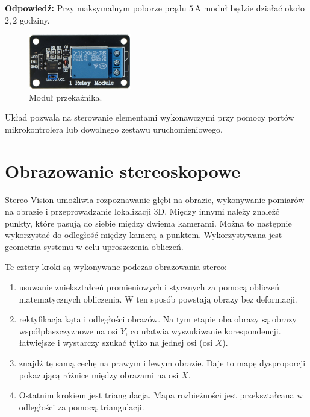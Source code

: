 \documentclass[magisterska]{pracadypl}
\begin{document}
\textbf{Odpowiedź:} Przy maksymalnym poborze prądu $5\,\mathrm{A}$ moduł będzie działać około $2{,}2$ godziny.

\begin{figure}[H]  %
    \centering  %
    \includegraphics[width=0.4\textwidth]{images/relay.png}  %
    \captionsetup{font=footnotesize}
    \caption[Moduł przekaźnika. https://botland.com.pl/przekazniki-przekazniki-arduino/1997-modul-przekaznika-1-kanal-z-optoizolacja-styki-10a-250vac-cewka-5v-5904422359096.html]{Moduł przekaźnika.}
\end{figure}

Układ pozwala na sterowanie elementami wykonawczymi przy pomocy portów mikrokontrolera lub dowolnego zestawu uruchomieniowego.

\section{Obrazowanie stereoskopowe}

Stereo Vision umożliwia rozpoznawanie głębi na obrazie, wykonywanie pomiarów na obrazie
i przeprowadzanie lokalizacji 3D. Między innymi należy znaleźć punkty, które pasują do siebie między dwiema kamerami. Można to następnie wykorzystać do odległość między kamerą a punktem. Wykorzystywana jest geometria systemu w celu uproszczenia obliczeń.

Te cztery kroki są wykonywane podczas obrazowania stereo:

\begin{enumerate}
  \item usuwanie zniekształceń promieniowych i stycznych za pomocą obliczeń matematycznych
obliczenia. W ten sposób powstają obrazy bez deformacji.
  \item rektyfikacja kąta i odległości obrazów. Na tym etapie oba obrazy są
obrazy współpłaszczyznowe na osi $Y$, co ułatwia wyszukiwanie korespondencji.
łatwiejsze i wystarczy szukać tylko na jednej osi (osi $X$).
  \item znajdź tę samą cechę na prawym i lewym obrazie. Daje to mapę dysproporcji pokazującą różnice między obrazami na osi $X$.
  \item Ostatnim krokiem jest triangulacja. Mapa rozbieżności jest przekształcana w odległości za pomocą triangulacji.
\end{enumerate}
\end{document}

